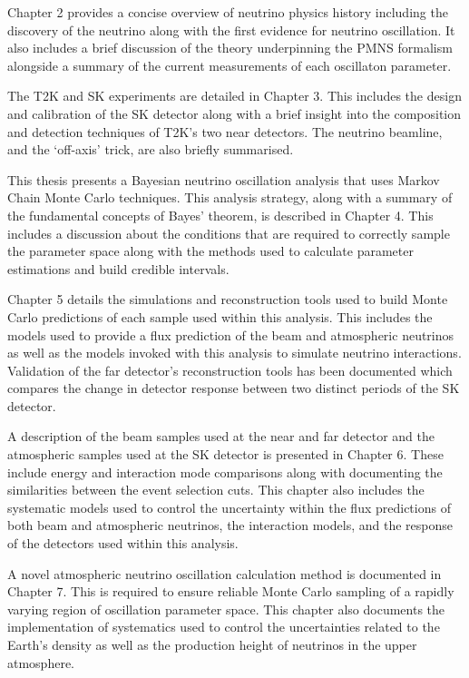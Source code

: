 Chapter 2 provides a concise overview of neutrino physics history including the discovery of the neutrino along with the first evidence for neutrino oscillation. It also includes a brief discussion of the theory underpinning the PMNS formalism alongside a summary of the current measurements of each oscillaton parameter.

The T2K and SK experiments are detailed in Chapter 3. This includes the design and calibration of the SK detector along with a brief insight into the composition and detection techniques of T2K's two near detectors. The neutrino beamline, and the `off-axis' trick, are also briefly summarised. 

This thesis presents a Bayesian neutrino oscillation analysis that uses Markov Chain Monte Carlo techniques. This analysis strategy, along with a summary of the fundamental concepts of Bayes' theorem, is described in Chapter 4. This includes a discussion about the conditions that are required to correctly sample the parameter space along with the methods used to calculate parameter estimations and build credible intervals.

Chapter 5 details the simulations and reconstruction tools used to build Monte Carlo predictions of each sample used within this analysis. This includes the models used to provide a flux prediction of the beam and atmospheric neutrinos as well as the models invoked with this analysis to simulate neutrino interactions. Validation of the far detector's reconstruction tools has been documented which compares the change in detector response between two distinct periods of the SK detector.

A description of the beam samples used at the near and far detector and the atmospheric samples used at the SK detector is presented in Chapter 6. These include energy and interaction mode comparisons along with documenting the similarities between the event selection cuts. This chapter also includes the systematic models used to control the uncertainty within the flux predictions of both beam and atmospheric neutrinos, the interaction models, and the response of the detectors used within this analysis.

A novel atmospheric neutrino oscillation calculation method is documented in Chapter 7. This is required to ensure reliable Monte Carlo sampling of a rapidly varying region of oscillation parameter space. This chapter also documents the implementation of systematics used to control the uncertainties related to the Earth's density as well as the production height of neutrinos in the upper atmosphere.

